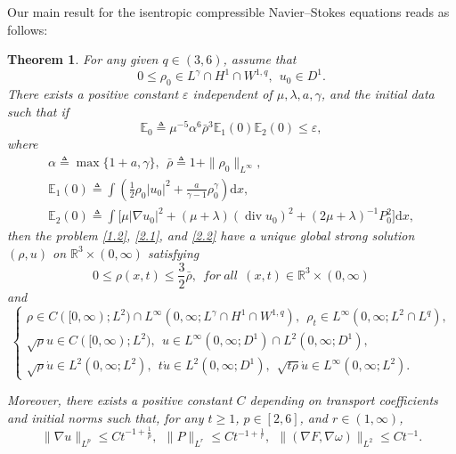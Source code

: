 \documentclass[11pt]{article}
\newtheorem{Theorem}{Theorem}[section]
\DeclareMathOperator{\divv}{div}
\begin{document}
Our main result for the isentropic compressible Navier--Stokes equations reads as follows:
\begin{Theorem}\label{thm2.1}
For any given $q\in(3, 6)$, assume that
\begin{equation}\label{2.3}
0 \leq\rho_0 \in L^{\gamma} \cap H^1 \cap W^{1,q},\ \
u_0 \in D^1.
\end{equation}
There exists a positive constant $\varepsilon$ independent of $\mu, \lambda, a, \gamma$, and the initial data such that if
\begin{equation}\label{2.4}
\mathbb{E}_0\triangleq \mu^{-5} \alpha^{6} \bar{\rho}^3 \mathbb{E}_1 (0) \mathbb{E}_2 (0) \leq \varepsilon,
\end{equation}
where
\begin{gather*}
\alpha \triangleq \max\{1 + a, \gamma\},\ \ \bar{\rho} \triangleq 1 + \|\rho_0\|_{L^{\infty }},\\
\mathbb{E}_1 (0) \triangleq \int \left(\frac{1}{2} \rho_0 |u_0|^2 + \frac{a}{\gamma - 1} \rho_0^{\gamma} \right) \mathrm{d} x,\\
\mathbb{E}_2 (0)
\triangleq \int \big[\mu |\nabla u_0|^2 + (\mu + \lambda)(\divv u_0)^2 + \left(2 \mu + \lambda \right)^{-1}P_0^2 \big] \mathrm{d} x,
\end{gather*}
then the problem \eqref{1.2}, \eqref{2.1}, and \eqref{2.2} have a unique global strong solution $(\rho, u)$ on $\mathbb{R}^3 \times (0,\infty)$ satisfying
\begin{equation}\label{2.5}
0\leq \rho(x,t)\leq \frac{3}{2}\bar\rho,\ \ {for \ all}\ \  (x,t)\in \mathbb{R}^3 \times(0, \infty)
\end{equation}
and
\begin{equation}\label{2.6}
\begin{cases}
\rho \in C([0, \infty);L^2) \cap L^\infty(0, \infty; L^{\gamma} \cap H^1 \cap W^{1,q}), \ \ \rho_t \in L^\infty(0, \infty;L^2\cap L^q),\\[1mm]
\sqrt \rho u \in C ([0, \infty);L^2),\ \ u \in L^\infty(0, \infty; D^1) \cap L^2 (0, \infty; D^1),\\[1mm]
\sqrt \rho \dot{u} \in L^2 (0, \infty; L^2), \ \ t \dot{u} \in L^2 (0, \infty; D^1),\ \ \sqrt{t \rho} \dot{u} \in L^\infty(0, \infty;L^2).
\end{cases}
\end{equation}

Moreover, there exists a positive constant $C$ depending on transport coefficients and initial norms such that, for any $t \geq 1$, $p \in [2,6]$, and $r \in (1,\infty )$,
\begin{equation}\label{2.7}
\|\nabla u\|_{L^p} \leq C t^{- 1 + \frac{1}{p}},\ \
\|P\|_{L^r} \leq C t^{- 1 + \frac{1}{r}},\ \
\|(\nabla F,\nabla \omega )\|_{L^2} \leq C t^{- 1}.
\end{equation}
\end{Theorem}
\end{document}
